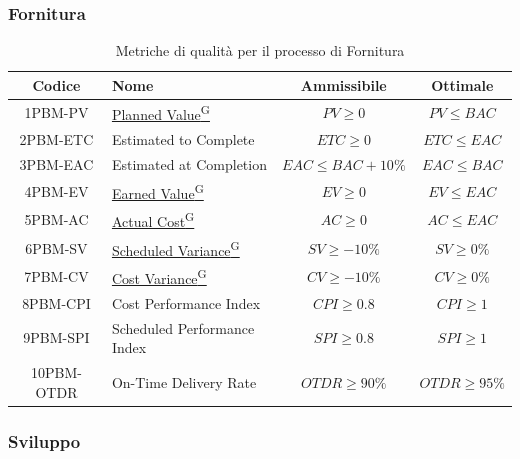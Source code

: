 \documentclass{article}
\begin{document}
\subsubsection{Fornitura} %
\begin{table}[H]
    \centering
    \renewcommand{\arraystretch}{1.5} %
    \begin{tabular}{|c|l|c|c|}
        \hline
        \textbf{Codice} & \textbf{Nome} & \textbf{Ammissibile} & \textbf{Ottimale} \\
        \hline
        1PBM-PV & \href{https://code7crusaders.github.io/docs/PB/documentazione_interna/glossario.html#planned-value}{Planned Value\textsuperscript{G}} & $PV \geq 0$ & $PV \leq BAC$ \\
        2PBM-ETC & Estimated to Complete & $ETC \geq 0$ & $ETC \leq EAC$ \\
        3PBM-EAC & Estimated at Completion & $EAC \leq BAC + 10\%$ & $EAC \leq BAC$ \\
        4PBM-EV & \href{https://code7crusaders.github.io/docs/PB/documentazione_interna/glossario.html#earned-value}{Earned Value\textsuperscript{G}} & $EV \geq 0$ & $EV \leq EAC$ \\
        5PBM-AC & \href{https://code7crusaders.github.io/docs/PB/documentazione_interna/glossario.html#actual-cost}{Actual Cost\textsuperscript{G}} & $AC \geq 0$ & $AC \leq EAC$ \\
        6PBM-SV & \href{https://code7crusaders.github.io/docs/PB/documentazione_interna/glossario.html#scheduled-variance}{Scheduled Variance\textsuperscript{G}} & $SV \geq -10\%$ & $SV \geq 0\%$ \\
        7PBM-CV & \href{https://code7crusaders.github.io/docs/PB/documentazione_interna/glossario.html#cost-variance}{Cost Variance\textsuperscript{G}} & $CV \geq -10\%$ & $CV \geq 0\%$ \\
        8PBM-CPI & Cost Performance Index & $CPI \geq 0.8$ & $CPI \geq 1$ \\
        9PBM-SPI & Scheduled Performance Index & $SPI \geq 0.8$ & $SPI \geq 1$ \\
        10PBM-OTDR & On-Time Delivery Rate & $OTDR \geq 90\%$ & $OTDR \geq 95\%$ \\
        \hline
    \end{tabular}
    \label{tab:fornitura}
    \caption{Metriche di qualità per il processo di Fornitura}
\end{table}

\subsubsection{Sviluppo} %
\end{document}
